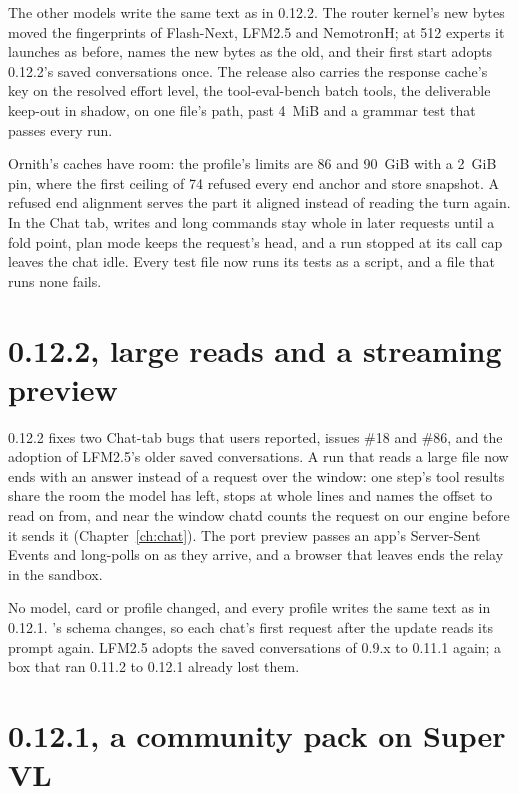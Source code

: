 The other models write the same text as in 0.12.2. The router kernel's new bytes moved the fingerprints of Flash-Next, LFM2.5 and NemotronH; at 512 experts it launches as before,  names the new bytes as the old, and their first start adopts 0.12.2's saved conversations once. The release also carries the response cache's key on the resolved effort level, the tool-eval-bench batch tools, the deliverable keep-out in shadow,  on one file's path,  past 4~MiB and a grammar test that passes every run.

Ornith's caches have room: the profile's limits are 86 and 90~GiB with a 2~GiB pin, where the first ceiling of 74 refused every end anchor and store snapshot. A refused end alignment serves the part it aligned instead of reading the turn again. In the Chat tab, writes and long commands stay whole in later requests until a fold point, plan mode keeps the request's head, and a run stopped at its call cap leaves the chat idle. Every test file now runs its tests as a script, and a file that runs none fails.

\section{0.12.2, large reads and a streaming preview}\label{sec:changelog-0122}

0.12.2 fixes two Chat-tab bugs that users reported, issues \#18 and \#86, and the adoption of LFM2.5's older saved conversations. A run that reads a large file now ends with an answer instead of a request over the window: one step's tool results share the room the model has left,  stops at whole lines and names the offset to read on from, and near the window chatd counts the request on our engine before it sends it (Chapter~\ref{ch:chat}). The port preview passes an app's Server-Sent Events and long-polls on as they arrive, and a browser that leaves ends the relay in the sandbox.

No model, card or profile changed, and every profile writes the same text as in 0.12.1. 's schema changes, so each chat's first request after the update reads its prompt again. LFM2.5 adopts the saved conversations of 0.9.x to 0.11.1 again; a box that ran 0.11.2 to 0.12.1 already lost them.

\section{0.12.1, a community pack on Super VL}\label{sec:changelog-0121}

